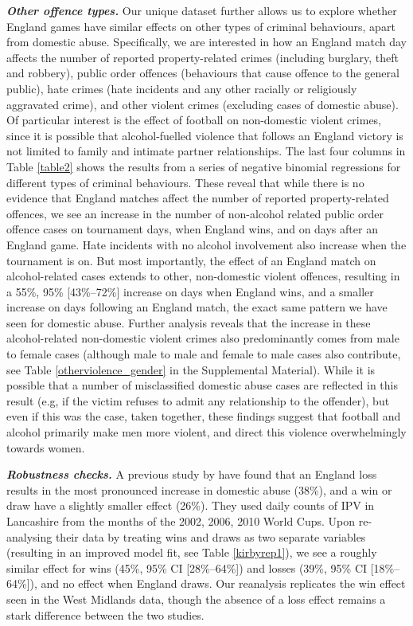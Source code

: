 \documentclass[12pt, a4paper]{article}
\begin{document}
\textbf{\textit{Other offence types.}} Our unique dataset further allows us to explore whether England games have similar effects on other types of criminal behaviours, apart from domestic abuse. Specifically, we are interested in how an England match day affects the number of reported property-related crimes (including burglary, theft and robbery), public order offences (behaviours that cause offence to the general public), hate crimes (hate incidents and any other racially or religiously aggravated crime), and other violent crimes (excluding cases of domestic abuse). Of particular interest is the effect of football on non-domestic violent crimes, since it is possible that alcohol-fuelled violence that follows an England victory is not limited to family and intimate partner relationships. The last four columns in Table \ref{table2} shows the results from a series of negative binomial regressions for different types of criminal behaviours. These reveal that while there is no evidence that England matches affect the number of reported property-related offences, we see an increase in the number of non-alcohol related public order offence cases on tournament days, when England wins, and on days after an England game. Hate incidents with no alcohol involvement also increase when the tournament is on. But most importantly, the effect of an England match on alcohol-related cases extends to other, non-domestic violent offences, resulting in a 55\%, 95\% [43\%--72\%] increase on days when England wins, and a smaller increase on days following an England match, the exact same pattern we have seen for domestic abuse. Further analysis reveals that the increase in these alcohol-related non-domestic violent crimes also predominantly comes from male to female cases (although male to male and female to male cases also contribute, see Table \ref{otherviolence_gender} in the Supplemental Material). While it is possible that a number of misclassified domestic abuse cases are reflected in this result (e.g, if the victim refuses to admit any relationship to the offender), but even if this was the case, taken together, these findings suggest that football and alcohol primarily make men more violent, and direct this violence overwhelmingly towards women.

\textbf{\textit{Robustness checks.}} A previous study by  have found that an England loss results in the most pronounced increase in domestic abuse (38\%), and a win or draw have a slightly smaller effect (26\%). They used daily counts of IPV in Lancashire from the months of the 2002, 2006, 2010 World Cups. Upon re-analysing their data by treating wins and draws as two separate variables (resulting in an improved model fit, see Table \ref{kirbyrep1}), we see a roughly similar effect for wins (45\%, 95\% CI [28\%--64\%]) and losses (39\%, 95\% CI [18\%--64\%]), and no effect when England draws. Our reanalysis replicates the win effect seen in the West Midlands data, though the absence of a loss effect remains a stark difference between the two studies.
\end{document}

